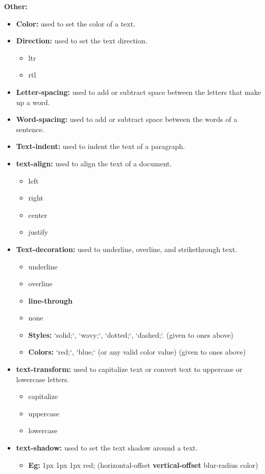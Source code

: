 \documentclass{report}
\begin{document}
    \bigbreak \noindent 
    \textbf{Other:}
    \begin{itemize}
        \item \textbf{Color:} used to set the color of a text.
        \item \textbf{Direction:} used to set the text direction.
            \begin{itemize}
                \item ltr
                \item rtl
            \end{itemize}
        \item \textbf{Letter-spacing:} used to add or subtract space between the letters that make up a word.
        \item \textbf{Word-spacing:} used to add or subtract space between the  words of a sentence.
        \item \textbf{Text-indent:} used to indent the text of a paragraph.
        \item \textbf{text-align:} used to align the text of a document.
            \begin{itemize}
                \item left
                \item right
                \item center
                \item justify
            \end{itemize}
        \item \textbf{Text-decoration:} used to underline, overline, and strikethrough text.
            \begin{itemize}
                 \item underline
                \item overline
                \item \textbf{line-through}
                \item none
                \item \textbf{Styles:} `solid;`, `wavy;`, `dotted;`, `dashed;`. (given to ones above)
                \item \textbf{Colors:} `red;`, `blue;` (or any valid color value) (given to ones above)
            \end{itemize}
        \item \textbf{text-transform:} used to capitalize text or convert text to uppercase or lowercase letters.
            \begin{itemize}
                \item capitalize
                \item uppercase
                \item lowercase
            \end{itemize}
        \item \textbf{text-shadow:} used to set the text shadow around a text.
        \begin{itemize}
            \item \textbf{Eg:} 1px 1px 1px red; (horizontal-offset \textbf{vertical-offset} blur-radius color)
        \end{itemize}
    \end{itemize}
\end{document}
